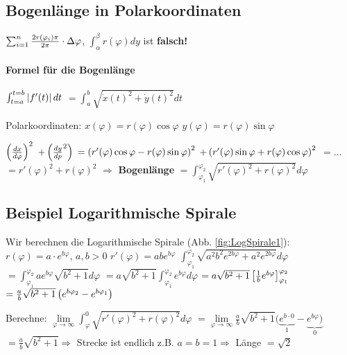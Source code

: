 \renewcommand{\ldate}{2015-11-05}

\subsection{Bogenlänge in Polarkoordinaten}

$\sum_{i=1}^{n} \frac{2r(\varphi_i) \pi}{2\pi} \cdot \Delta \varphi$, 
$\int_{\alpha}^{\beta} r(\varphi) dy$ ist \textbf{falsch!}

\paragraph{Formel für die Bogenlänge}
$\int_{t=a}^{t=b}  \left\vert f'(t) \right\vert  dt $
$= \int_{a}^{b} \sqrt{\dot x (t)^2 + \dot y (t)^2} dt$

Polarkoordinaten: $ x(\varphi) = r(\varphi) \cos \varphi$
$y(\varphi) = r(\varphi) \sin \varphi$

$ \left( \frac{dx}{d\varphi} \right) ^2 $
$+  \left( \frac{dy}{dp}^2 \right)  $
$= \left(  r'(\varphi) \cos \varphi- r(\varphi) \sin \varphi \right) ^2$
$+  \left(  r'(\varphi) \sin \varphi + r(\varphi) \cos \varphi \right) ^2$
$= ...$
$= r'(\varphi)^2 + r(\varphi)^2$
$\Rightarrow $ \textbf{Bogenlänge} 
$= \int_{\varphi_1}^{\varphi_2} \sqrt{r'(\varphi)^2 + r(\varphi)^2} d\varphi$

\subsection{Beispiel Logarithmische Spirale}

Wir berechnen die Logarithmische Spirale (Abb. \ref{fig:LogSpirale1}): $r(\varphi) = a \cdot e^{b\varphi}$, 
$a, b > 0$
$ r'(\varphi) = a b e^{b\varphi}$
$\int_{\varphi_1}^{\varphi_2} \sqrt{a^2 b^2 e^{2 b \varphi} + a^2 e^{2b\varphi}} d\varphi $
$=\int_{\varphi_1}^{\varphi_2} a e^{b \varphi} \sqrt{b^2 + 1} d\varphi $
$=a\sqrt{b^2 + 1} \int_{\varphi_1}^{\varphi_2}  e^{b \varphi } d\varphi $
$=a\sqrt{b^2 + 1}  \left[ \frac{1}{b} e^{b\varphi} \right] _{\varphi_1}^{\varphi_2} $
$=\frac{a}{b} \sqrt{b^2 + 1}  \left( e^{b\varphi_2} - e^{b\varphi_1} \right) $

Berechne: 
$ \lim\limits_{\varphi \rightarrow \infty} \int_{\varphi}^{0} \sqrt{r'(\varphi)^2 + r(\varphi)^2} d\varphi$
$= \lim\limits_{\varphi \rightarrow \infty} \frac{a}{b} \sqrt{b^2+1} (\underbrace{e^{b\cdot 0}}_{1} - \underbrace{e^{b\varphi})}_{0}$
$= \frac{a}{b} \sqrt{b^2 + 1} \Rightarrow$ Strecke ist endlich 
z.B. $a=b=1 \Rightarrow$ Länge $=\sqrt{2}$

